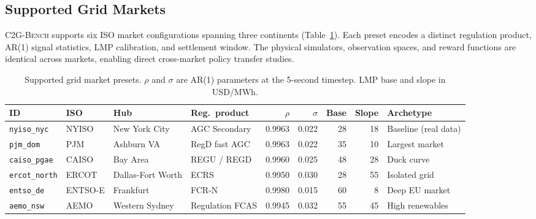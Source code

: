 \documentclass{article}
\newcommand{\cname}{\textsc{C2G-Bench}}
\begin{document}
\subsection{Supported Grid Markets}
\label{sec:markets}

\cname{} supports six ISO market configurations spanning three continents
(Table~\ref{tab:markets}).
Each preset encodes a distinct regulation product, AR(1) signal statistics,
LMP calibration, and settlement window.
The physical simulators, observation spaces, and reward functions are identical
across markets, enabling direct cross-market policy transfer studies.

\begin{table}[t]
\centering
\caption{Supported grid market presets.
$\rho$ and $\sigma$ are AR(1) parameters at the 5-second timestep.
LMP base and slope in USD/MWh.}
\label{tab:markets}
\small
\setlength{\tabcolsep}{4pt}
\begin{tabular}{llllrrrrl}
\toprule
\textbf{ID} & \textbf{ISO} & \textbf{Hub} & \textbf{Reg.\ product}
  & $\rho$ & $\sigma$ & \textbf{Base} & \textbf{Slope} & \textbf{Archetype} \\
\midrule
\texttt{nyiso\_nyc}   & NYISO   & New York City     & AGC Secondary  & 0.9963 & 0.022 & 28 & 18 & Baseline (real data) \\
\texttt{pjm\_dom}     & PJM     & Ashburn VA        & RegD fast AGC  & 0.9963 & 0.022 & 35 & 10 & Largest market \\
\texttt{caiso\_pgae}  & CAISO   & Bay Area          & REGU / REGD    & 0.9960 & 0.025 & 48 & 28 & Duck curve \\
\texttt{ercot\_north} & ERCOT   & Dallas-Fort Worth & ECRS           & 0.9950 & 0.030 & 28 & 55 & Isolated grid \\
\texttt{entso\_de}    & ENTSO-E & Frankfurt         & FCR-N          & 0.9980 & 0.015 & 60 &  8 & Deep EU market \\
\texttt{aemo\_nsw}    & AEMO    & Western Sydney    & Regulation FCAS & 0.9945 & 0.032 & 55 & 45 & High renewables \\
\bottomrule
\end{tabular}
\end{table}
\end{document}
